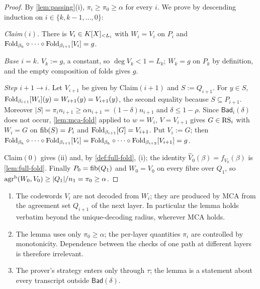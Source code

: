 \begin{proof}
By \cref{lem:passing}(i), $\pi_i\ge\pi_0\ge\alpha$ for every $i$. We prove by descending
induction on $i\in\{k,k-1,\dots,0\}$:

\smallskip\noindent\emph{Claim$(i)$.} There is $V_i\in K[X]_{<L_i}$ with
$W_i=V_i$ on $P_i$ and
$\mathrm{Fold}_{\beta_k}\circ\cdots\circ\mathrm{Fold}_{\beta_{i+1}}[V_i]=g$.

\smallskip\noindent\emph{Base $i=k$.} $V_k:=g$, a constant, so $\deg V_k<1=L_k$;
$W_k=g$ on $P_k$ by definition, and the empty composition of folds gives $g$.

\smallskip\noindent\emph{Step $i+1\to i$.} Let $V_{i+1}$ be given by Claim$(i+1)$ and
$S:=Q_{i+1}$. For $y\in S$, $\mathrm{Fold}_{\beta_{i+1}}[W_i](y)=W_{i+1}(y)=V_{i+1}(y)$, the
second equality because $S\subseteq P_{i+1}$. Moreover
$|S|=\pi_in_{i+1}\ge\alpha n_{i+1}=(1-\delta)n_{i+1}$ and $\delta\le1-\rho$. Since
$\mathsf{Bad}_i(\delta)$ does not occur, \cref{lem:mca-fold} applied to $w=W_i$,
$V=V_{i+1}$ gives $G\in\mathrm{RS}_i$ with $W_i=G$ on $\mathrm{fib}(S)=P_i$ and
$\mathrm{Fold}_{\beta_{i+1}}[G]=V_{i+1}$. Put $V_i:=G$; then
$\mathrm{Fold}_{\beta_k}\circ\cdots\circ\mathrm{Fold}_{\beta_{i+1}}[V_i]
=\mathrm{Fold}_{\beta_k}\circ\cdots\circ\mathrm{Fold}_{\beta_{i+2}}[V_{i+1}]=g$.

\smallskip
Claim$(0)$ gives (ii) and, by \cref{def:full-fold}, (i); the identity $\widehat V_0(\beta)=f_{V_0}(\beta)$ is
\cref{lem:full-fold}.
Finally $P_0=\mathrm{fib}(Q_1)$ and $W_0=V_0$ on every fibre over $Q_1$, so
$\mathrm{agr}^{\mathrm{b}}(W_0,V_0)\ge|Q_1|/n_1=\pi_0\ge\alpha$.
\end{proof}

\begin{remark}\label{rem:master-structure}
\begin{enumerate}[label=\textup{(\roman*)}]
\item The codewords $V_i$ are not decoded from $W_i$; they are produced by MCA from
the agreement set $Q_{i+1}$ of the next layer. In particular the lemma holds verbatim
beyond the unique-decoding radius, wherever MCA holds.
\item The lemma uses only $\pi_0\ge\alpha$; the per-layer quantities $\pi_i$ are
controlled by monotonicity. Dependence between the checks of one path at different
layers is therefore irrelevant.
\item The prover's strategy enters only through $\tau$; the lemma is a statement about
every transcript outside $\mathsf{Bad}(\delta)$.
\end{enumerate}
\end{remark}

